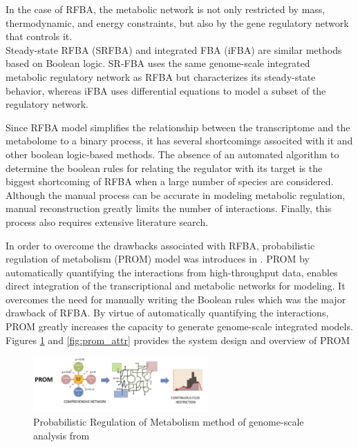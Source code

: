 \documentclass[12pt,chapterheads]{ucsd}
\begin{document}
In the case of RFBA, the metabolic network is not only restricted by mass, thermodynamic, and energy constraints, but also by the gene regulatory network that controls it.\\
Steady-state RFBA (SRFBA) \cite{Shlomi2007} and integrated FBA (iFBA) \cite{doi:10.1093/bioinformatics/btn352} are similar methods based on Boolean logic. SR-FBA uses the same genome-scale integrated metabolic regulatory network as RFBA but characterizes its steady-state behavior, whereas iFBA uses differential equations to model a subset of the regulatory network.

Since RFBA model simplifies the relationship between the transcriptome and the metabolome to a binary process, it has several shortcomings associted with it and other boolean logic-based methods. The absence of an automated algorithm to determine the boolean rules for relating the regulator with its target is the biggest shortcoming of RFBA when a large number of species are considered. Although the manual process can be accurate in modeling metabolic regulation, manual reconstruction greatly limits the number of interactions. Finally, this process also requires extensive literature search. 

In order to overcome the drawbacks associated with RFBA, probabilistic regulation of metabolism (PROM) model was introduces in \cite{Chandrasekaran17845}. PROM by automatically quantifying the interactions from high-throughput data, enables direct integration of the transcriptional and metabolic networks for modeling. It overcomes the need for manually writing the Boolean rules which was the major drawback of RFBA. By virtue of automatically quantifying the interactions, PROM greatly increases the capacity to generate genome-scale integrated models. Figures \ref{fig:prom_mech} and \ref{fig:prom_attr}  provides the system design and overview of PROM

\begin{figure}[h] 
\centering
\includegraphics[width=0.6\textwidth]{prom_mech}
\caption[Probabilistic Regulation of Metabolism method of genome-scale analysis]
{Probabilistic Regulation of Metabolism method of genome-scale analysis from \cite{Chandrasekaran17845}}
\label{fig:prom_mech}
\end{figure}
\end{document}

